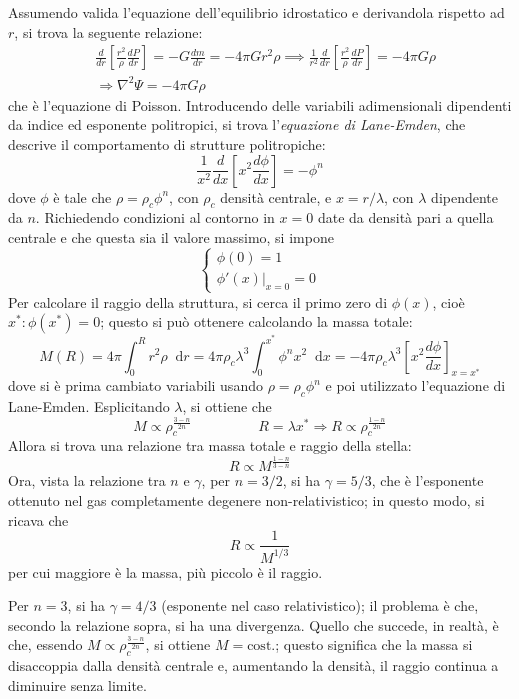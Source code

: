 \documentclass[11pt, a4paper]{scrartcl}
\theoremstyle{style}
\theoremstyle{style1}
\newcommand{\dd}{\mathop{}\!\mathrm{d}}
\numberwithin{equation}{subsection}
\begin{document}
Assumendo valida l'equazione dell'equilibrio idrostatico e derivandola rispetto ad $r$, si trova la seguente relazione:
\[
	\begin{split}
		&\frac{d }{d r}  \left[ \frac{r^2}{\rho } \frac{d P}{d r}  \right] = - G \frac{d m}{d r } = - 4 \pi G r^2 \rho  \implies \frac{1}{r^2} \frac{d }{d r}  \left[ \frac{r^2}{\rho }\frac{d P}{d r}  \right] = - 4 \pi G \rho \\
		&\Rightarrow \nabla ^2 \Psi = - 4\pi G \rho 
	\end{split}
\] 
che \`e l'equazione di Poisson.
Introducendo delle variabili adimensionali dipendenti da indice ed esponente politropici, si trova l'\textit{equazione di Lane-Emden}, che descrive il comportamento di strutture politropiche:
\[
\frac{1}{x^2}\frac{d }{d x} \left[ x^2 \frac{d \phi }{d x}  \right] = - \phi ^n
\] 
dove $\phi $ \`e tale che $\rho  = \rho  _c \phi ^n$, con $\rho _c$ densit\`a centrale, e $x = r / \lambda $, con $\lambda $ dipendente da $n$.
Richiedendo condizioni al contorno in $x=0$ date da densit\`a pari a quella centrale e che questa sia il valore massimo, si impone 
\[
\begin{cases}
	\phi (0) = 1 \\
	\phi '(x)|_{x=0} = 0 
\end{cases}
\] 
Per calcolare il raggio della struttura, si cerca il primo zero di $\phi (x)$, cio\`e $x^* : \phi (x^*) =0 $; questo si pu\`o ottenere calcolando la massa totale:
\[
M(R) = 4\pi \int _0 ^R r^2 \rho  \dd r = 4 \pi \rho _c\lambda ^3 \int _0^{x^*} \phi ^n x^2 \dd x = - 4 \pi \rho _c \lambda ^3 \left[ x^2 \frac{d \phi }{d x}  \right] _{x=x^*} 
\] 
dove si \`e prima cambiato variabili usando $\rho  = \rho _c \phi ^n$ e poi utilizzato l'equazione di Lane-Emden.
Esplicitando $\lambda $, si ottiene che 
\[
M \propto \rho _c ^{\frac{3-n}{2n}} \hspace{2cm}R = \lambda x^* \Rightarrow R \propto \rho _c ^{\frac{1-n}{2n}}
\] 
Allora si trova una relazione tra massa totale e raggio della stella:
\[
R \propto M^{\frac{1-n}{3-n}}
\] 
Ora, vista la relazione tra $n$ e $\gamma$, per $n= 3 / 2$, si ha $\gamma = 5 / 3$, che \`e l'esponente ottenuto nel gas completamente degenere non-relativistico; in questo modo, si ricava che
\[
R \propto \frac{1}{M^{1 / 3}}
\] 
per cui maggiore \`e la massa, pi\`u piccolo \`e il raggio.

Per $n=3$, si ha $\gamma = 4 / 3$ (esponente nel caso relativistico); il problema \`e che, secondo la relazione sopra, si ha una divergenza.
Quello che succede, in realt\`a, \`e che, essendo $M \propto \rho _c ^{\frac{3-n}{2n}}$, si ottiene $M = \text{cost.}$; questo significa che la massa si disaccoppia dalla densit\`a centrale e, aumentando la densit\`a, il raggio continua a diminuire senza limite. 
\end{document}
